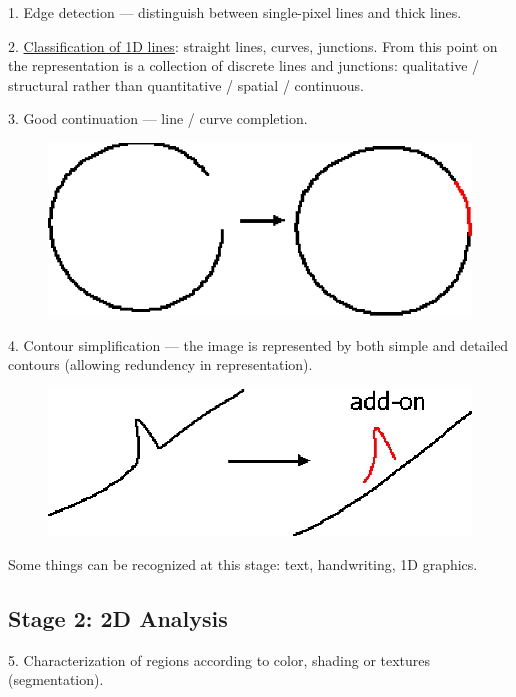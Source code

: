 1. Edge detection --- distinguish between single-pixel lines and thick lines.

2. \href{Vis-1DTaxonomy.htm}{Classification of 1D lines}: straight lines, curves, junctions. From this point on the representation is a collection of discrete lines and junctions: qualitative / structural rather than quantitative / spatial / continuous.

3. Good continuation --- line / curve completion.

\begin{figure}[H]
\centering
\includegraphics[scale=0.6, bb=0 0 265 109]{GoodContinuation.eps}
\end{figure}

4. Contour simplification --- the image is represented by both simple and detailed contours (allowing redundency in representation).

\begin{figure}[H]
\centering
\includegraphics[scale=0.6, bb=0 0 346 120]{ContourSimplification.eps}
\end{figure}

Some things can be recognized at this stage: text, handwriting, 1D graphics.

\subsection{Stage 2: 2D Analysis}

5. Characterization of regions according to color, shading or textures (segmentation).

